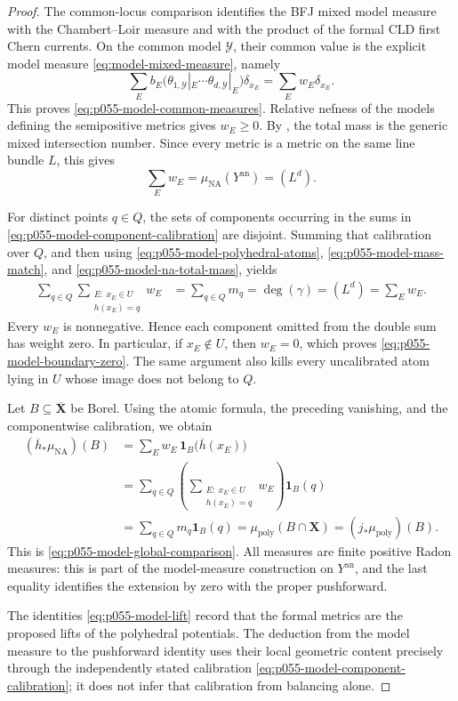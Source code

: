 \begin{proof}
The common-locus comparison
 identifies the BFJ mixed model
measure with the Chambert--Loir measure and with the product of the formal
CLD first Chern currents.  On the common
model $\mathcal Y$, their common value is the explicit model measure
\eqref{eq:model-mixed-measure}, namely
\[
 \sum_E b_E
 \bigl(\theta_{1,\mathcal Y}|_E\cdots
       \theta_{d,\mathcal Y}|_E\bigr)\delta_{x_E}
 =\sum_Ew_E\delta_{x_E}.
\]
This proves \eqref{eq:p055-model-common-measures}.  Relative nefness of the
models defining the semipositive metrics gives $w_E\geq0$.  By
, the total mass is the generic mixed
intersection number.  Since every metric is a metric on the same line
bundle $L$, this gives
\begin{equation}
 \sum_Ew_E=\mu_{\mathrm{NA}}(Y^{\mathrm{an}})=(L^d).
 \label{eq:p055-model-na-total-mass}
\end{equation}

For distinct points $q\in Q$, the sets of components occurring in the
sums in \eqref{eq:p055-model-component-calibration} are disjoint.  Summing
that calibration over $Q$, and then using
\eqref{eq:p055-model-polyhedral-atoms},
\eqref{eq:p055-model-mass-match}, and
\eqref{eq:p055-model-na-total-mass}, yields
\begin{align*}
 \sum_{q\in Q}
 \sum_{\substack{E:\ x_E\in U\\h(x_E)=q}}w_E
 &=\sum_{q\in Q}m_q
 =\deg(\gamma)
 =(L^d)
 =\sum_Ew_E.
\end{align*}
Every $w_E$ is nonnegative.  Hence each component omitted from the
double sum has weight zero.  In particular, if $x_E\notin U$, then
$w_E=0$, which proves \eqref{eq:p055-model-boundary-zero}.  The same
argument also kills every uncalibrated atom lying in $U$ whose image does
not belong to $Q$.

Let $B\subseteq\overline{\mathbf X}$ be Borel.  Using the atomic formula,
the preceding vanishing, and the componentwise calibration, we obtain
\begin{align*}
 (\overline h_*\mu_{\mathrm{NA}})(B)
 &=\sum_Ew_E\,\mathbf 1_B\bigl(\overline h(x_E)\bigr)\\
 &=\sum_{q\in Q}
   \left(
    \sum_{\substack{E:\ x_E\in U\\h(x_E)=q}}w_E
   \right)\mathbf 1_B(q)\\
 &=\sum_{q\in Q}m_q\mathbf 1_B(q)
  =\mu_{\mathrm{poly}}(B\cap\mathbf X)
  =(j_*\mu_{\mathrm{poly}})(B).
\end{align*}
This is \eqref{eq:p055-model-global-comparison}.  All measures are finite
positive Radon measures: this is part of the model-measure construction on
$Y^{\mathrm{an}}$, and the last equality identifies the extension by zero
with the proper pushforward.

The identities \eqref{eq:p055-model-lift} record that the formal metrics
are the proposed lifts of the polyhedral potentials.  The deduction from
the model measure to the pushforward identity uses their local geometric
content precisely through the independently stated calibration
\eqref{eq:p055-model-component-calibration}; it does not infer that
calibration from balancing alone.
\end{proof}
